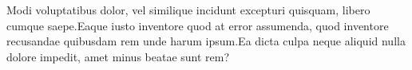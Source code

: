 \documentclass[letterpaper]{article} %
\begin{document}
\small
Modi voluptatibus dolor, vel similique incidunt excepturi quisquam, libero cumque saepe.Eaque iusto inventore quod at error assumenda, quod inventore recusandae quibusdam rem unde harum ipsum.Ea dicta culpa neque aliquid nulla dolore impedit, amet minus beatae sunt rem?\clearpage

\end{document}
